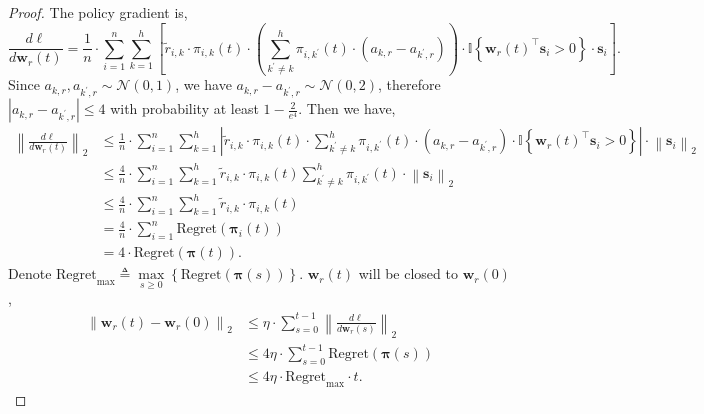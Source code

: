 \documentclass[10pt]{article}
\def\rvs{{\mathbf{s}}}
\def\rvw{{\mathbf{w}}}
\def\regret{{\text{Regret}}}
\def\rvpi{{\boldsymbol{\pi}}}
\def\sI{{\mathbb{I}}}
\def\gN{{\mathcal{N}}}
\begin{document}
\begin{proof}
The policy gradient is,
\begin{equation*}
	\frac{d\ell}{d \rvw_r(t)} = \frac{1}{n} \cdot \sum\limits_{i=1}^{n}{ \sum\limits_{k=1}^{h}{ \left[ \tilde{r}_{i,k} \cdot \pi_{i,k}(t) \cdot \left( \sum\limits_{k^\prime \not= k}^{h}{ \pi_{i,k^\prime}(t) \cdot \left( a_{k,r} - a_{k^\prime,r} \right)  } \right) \cdot \sI\left\{ \rvw_r(t)^\top \rvs_i > 0 \right\} \cdot \rvs_i \right] } }.
\end{equation*}
Since $a_{k,r}, a_{k^\prime,r} \sim \gN(0, 1)$, we have $a_{k,r} - a_{k^\prime,r} \sim \gN(0, 2)$, therefore $\left| a_{k,r} - a_{k^\prime,r} \right| \le 4$ with  probability at least $1 - \frac{2}{e^4} $. Then we have,
\begin{equation*}
\begin{split}
	\left\| \frac{d\ell}{d \rvw_r(t)} \right\|_2 &\le \frac{1}{n} \cdot \sum\limits_{i=1}^{n}{ \sum\limits_{k=1}^{h}{ \left| \tilde{r}_{i,k} \cdot \pi_{i,k}(t) \cdot \sum\limits_{k^\prime \not= k}^{h}{ \pi_{i,k^\prime}(t) \cdot \left( a_{k,r} - a_{k^\prime,r} \right)  } \cdot \sI\left\{ \rvw_r(t)^\top \rvs_i > 0 \right\} \right| \cdot \left\| \rvs_i \right\|_2 }} \\
	&\le \frac{4}{n} \cdot \sum\limits_{i=1}^{n}{ \sum\limits_{k=1}^{h}{ \tilde{r}_{i,k} \cdot \pi_{i,k}(t) \sum\limits_{k^\prime \not= k}^{h}{ \pi_{i,k^\prime}(t)  } \cdot \left\| \rvs_i \right\|_2  }} \\
	&\le \frac{4}{n} \cdot \sum\limits_{i=1}^{n}{ \sum\limits_{k=1}^{h}{ \tilde{r}_{i,k} \cdot \pi_{i,k}(t) }} \\
	&= \frac{4}{n} \cdot \sum\limits_{i=1}^{n}{ \regret(\rvpi_{i}(t)) } \\
	&= 4 \cdot \regret(\rvpi(t)).
\end{split}
\end{equation*}
Denote $\regret_{\max} \triangleq \max\limits_{s \ge 0}\left\{\regret\left( \rvpi(s) \right)\right\}$. $\rvw_r(t)$ will be closed to $\rvw_r(0)$,
\begin{equation*}
\begin{split}
	\left\| \rvw_r(t) - \rvw_r(0) \right\|_2 &\le \eta \cdot \sum\limits_{s=0}^{t-1}{\left\| \frac{d\ell}{d \rvw_r(s)} \right\|_2} \\
	&\le 4 \eta \cdot \sum\limits_{s=0}^{t-1}{ \regret(\rvpi(s)) } \\
	&\le 4 \eta \cdot \regret_{\max} \cdot t .
\end{split}
\end{equation*}

\end{proof}
\end{document}
